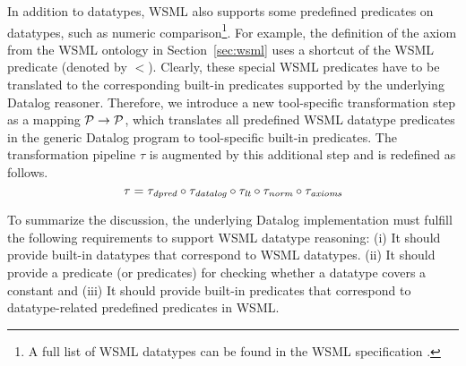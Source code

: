 In addition to datatypes, WSML also supports some predefined
predicates on datatypes, such as numeric comparison\footnote{A
full list of WSML datatypes can be found in the WSML specification
\cite{wsml-spec}.}. For example, the definition of the
 axiom from the WSML
ontology in Section~\ref{sec:wsml} uses a shortcut of the WSML
 predicate (denoted by $<$). Clearly, these
special WSML predicates have to be translated to the corresponding
built-in predicates supported by the underlying Datalog reasoner.
Therefore, we introduce a new tool-specific transformation step
\transdpred as a mapping $\P \rightarrow \P$, which translates all
predefined WSML datatype predicates in the generic Datalog program
to tool-specific built-in predicates. The transformation pipeline
$\tau$ is augmented by this additional step and is redefined as
follows.
\begin{displaymath}
    \tau = \transdpred \circ \transdlog \circ \translt \circ \transnorm \circ \transax
\end{displaymath}

To summarize the discussion, the underlying Datalog implementation
must fulfill the following requirements to support WSML datatype
reasoning: (i) It should provide built-in datatypes that
correspond to WSML datatypes. (ii) It should provide a predicate
(or predicates) for checking whether a datatype covers a constant
and (iii) It should provide built-in predicates that correspond to
datatype-related predefined predicates in WSML.

